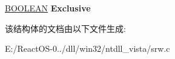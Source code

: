 \begin{DoxyCompactItemize}
\begin{tabbing}
\end{tabbing}\item 
\mbox{\label{struct___r_t_l_p___s_r_w_l_o_c_k___w_a_i_t_b_l_o_c_k_a4d47152fc8520d6585388fd82f72c027}} 
\hyperlink{_processor_bind_8h_a112e3146cb38b6ee95e64d85842e380a}{B\+O\+O\+L\+E\+AN} {\bfseries Exclusive}
\end{DoxyCompactItemize}


该结构体的文档由以下文件生成\+:\begin{DoxyCompactItemize}
\item 
E\+:/\+React\+O\+S-\/0../dll/win32/ntdll\+\_\+vista/srw.\+c\end{DoxyCompactItemize}
